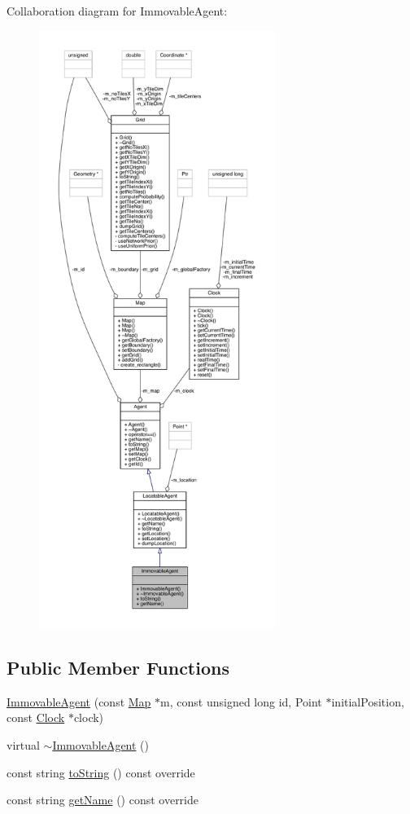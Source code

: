 Collaboration diagram for Immovable\+Agent\+:
\nopagebreak
\begin{figure}[H]
\begin{center}
\leavevmode
\includegraphics[height=550pt]{class_immovable_agent__coll__graph}
\end{center}
\end{figure}
\subsection*{Public Member Functions}
\begin{DoxyCompactItemize}
\item 
\mbox{\hyperlink{class_immovable_agent_a0b4253828510a7212b77c5921a057900}{Immovable\+Agent}} (const \mbox{\hyperlink{class_map}{Map}} $\ast$m, const unsigned long id, Point $\ast$initial\+Position, const \mbox{\hyperlink{class_clock}{Clock}} $\ast$clock)
\item 
virtual \mbox{\hyperlink{class_immovable_agent_aa2dfb26891059da00ff897a7c6e6a47c}{$\sim$\+Immovable\+Agent}} ()
\item 
const string \mbox{\hyperlink{class_immovable_agent_a805b0d18035550d902d617a8c7ccc062}{to\+String}} () const override
\item 
const string \mbox{\hyperlink{class_immovable_agent_ae8fbccc744f6f806e47dfd242fa67a1c}{get\+Name}} () const override
\end{DoxyCompactItemize}



